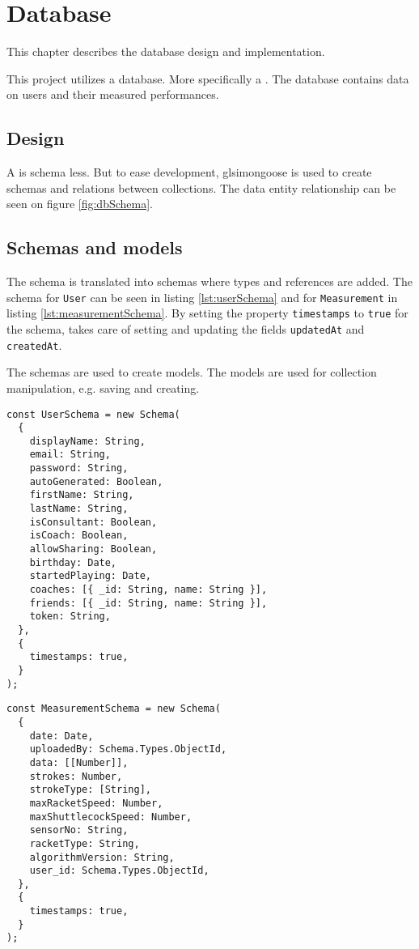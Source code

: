 \chapter{Database}
This chapter describes the database design and implementation.

This project utilizes a  database. More specifically a . The database contains data on users and their measured performances.

\section{Design}
A  is schema less.
But to ease development, glsi{mongoose} is used to create schemas and relations between collections.
The data entity relationship can be seen on figure \ref{fig:dbSchema}.


\section{Schemas and models}
The schema is translated into  schemas where types and references are added.
The schema for \verb+User+ can be seen in listing \ref{lst:userSchema} and for \verb+Measurement+ in listing \ref{lst:measurementSchema}.
By setting the property \verb+timestamps+ to \verb+true+ for the schema,  takes care of setting and updating the fields \verb+updatedAt+ and \verb+createdAt+.

The schemas are used to create  models.
The models are used for collection manipulation, e.g. saving and creating.

\begin{lstlisting}[caption=Mongoose User Schema, label=lst:userSchema]
const UserSchema = new Schema(
  {
    displayName: String,
    email: String,
    password: String,
    autoGenerated: Boolean,
    firstName: String,
    lastName: String,
    isConsultant: Boolean,
    isCoach: Boolean,
    allowSharing: Boolean,
    birthday: Date,
    startedPlaying: Date,
    coaches: [{ _id: String, name: String }],
    friends: [{ _id: String, name: String }],
    token: String,
  },
  {
    timestamps: true,
  }
);
\end{lstlisting}

\begin{lstlisting}[caption=Mongoose Measurement Schema, label=lst:measurementSchema]
const MeasurementSchema = new Schema(
  {
    date: Date,
    uploadedBy: Schema.Types.ObjectId,
    data: [[Number]],
    strokes: Number,
    strokeType: [String],
    maxRacketSpeed: Number,
    maxShuttlecockSpeed: Number,
    sensorNo: String,
    racketType: String,
    algorithmVersion: String,
    user_id: Schema.Types.ObjectId,
  },
  {
    timestamps: true,
  }
);
\end{lstlisting}
